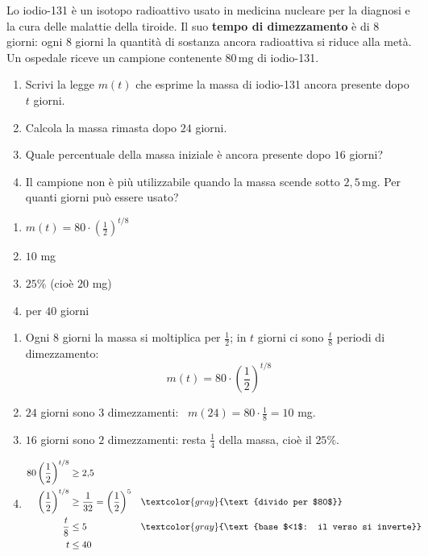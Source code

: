 \begin{question}[ID=6.1, subtitle={Tempo di dimezzamento dello iodio-131}, difficulty=media, tags={problemi, esponenziali, decadimento, tempo di dimezzamento}]
Lo iodio-131 è un isotopo radioattivo usato in medicina nucleare per la diagnosi e la cura delle malattie della tiroide. Il suo \textbf{tempo di dimezzamento} è di $8$ giorni: ogni $8$ giorni la quantità di sostanza ancora radioattiva si riduce alla metà. Un ospedale riceve un campione contenente $80\,\text{mg}$ di iodio-131.
\begin{enumerate}[label=\alph*),leftmargin=1.8cm]
    \item Scrivi la legge $m(t)$ che esprime la massa di iodio-131 ancora presente dopo $t$ giorni.
    \item Calcola la massa rimasta dopo $24$ giorni.
    \item Quale percentuale della massa iniziale è ancora presente dopo $16$ giorni?
    \item Il campione non è più utilizzabile quando la massa scende sotto $2{,}5\,\text{mg}$. Per quanti giorni può essere usato?
\end{enumerate}
\begin{solution}
\begin{enumerate}[label=\alph*),leftmargin=1.8cm]
    \item $m(t)=80\cdot\left(\tfrac12\right)^{t/8}$
    \item $10$ mg
    \item $25\%$ (cioè $20$ mg)
    \item per $40$ giorni
\end{enumerate}
\end{solution}
\begin{explanation}
\begin{enumerate}[label=\alph*),leftmargin=1.8cm]
    \item Ogni $8$ giorni la massa si moltiplica per $\tfrac12$; in $t$ giorni ci sono $\tfrac t8$ periodi di dimezzamento:
    \[ m(t)=80\cdot\left(\dfrac12\right)^{t/8} \]
    \item $24$ giorni sono $3$ dimezzamenti: \ $m(24)=80\cdot\tfrac18=10$ mg.
    \item $16$ giorni sono $2$ dimezzamenti: resta $\tfrac14$ della massa, cioè il $25\%$.
    \item \[\begin{aligned}
    80\left(\dfrac12\right)^{t/8} &\geq 2{,}5\\
    \left(\dfrac12\right)^{t/8} &\geq \dfrac{1}{32}=\left(\dfrac12\right)^5 && \textcolor{gray}{\text{divido per $80$}}\\
    \dfrac t8 &\leq 5 && \textcolor{gray}{\text{base $<1$: il verso si inverte}}\\
    t &\leq 40
    \end{aligned}\]
\end{enumerate}
\end{explanation}
\end{question}

